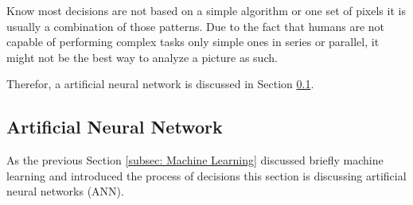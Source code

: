 \documentclass[conference]{IEEEtran}
\begin{document}
Know most decisions are not based on a simple algorithm or one set of pixels it is usually a combination of those patterns. Due to the fact that humans are not capable of performing complex tasks only simple ones in series or parallel, it might not be the best way to analyze a picture as such. 

Therefor, a artificial neural network is discussed in Section \ref{subsec: Artificial Neural Network}.

\subsection{Artificial Neural Network}\label{subsec: Artificial Neural Network}
As the previous Section \ref{subsec: Machine Learning} discussed briefly machine learning and introduced the process of decisions this section is discussing artificial neural networks (ANN). 
\end{document}
